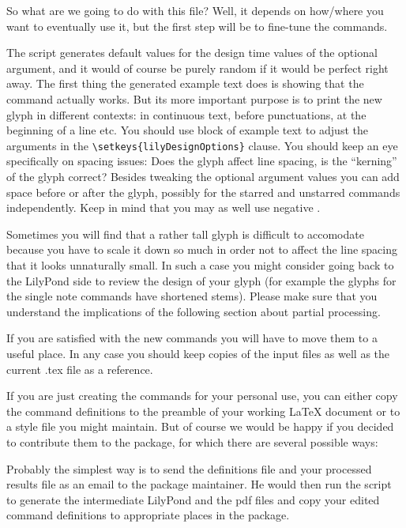 \documentclass{article}
\begin{document}
So what are we going to do with this file?
Well, it depends on how/where you want to eventually use it, but the first step will be to fine-tune the commands.

The script generates default values for the design time values of the optional argument, and it would of course be purely random if it would be perfect right away.
The first thing the generated example text does is showing that the command actually works.
But its more important purpose is to print the new glyph in different contexts: in continuous text, before punctuations, at the beginning of a line etc.
You should use block of example text to adjust the arguments in the \verb|\setkeys{lilyDesignOptions}| clause.
You should keep an eye specifically on spacing issues: Does the glyph affect line spacing, is the “kerning” of the glyph correct?
Besides tweaking the optional argument values you can add space before or after the glyph, possibly for the starred and unstarred commands independently.
Keep in mind that you may as well use negative .

Sometimes you will find that a rather tall glyph is difficult to accomodate because you have to scale it down so much in order not to affect the line spacing that it looks unnaturally small.
In such a case you might consider going back to the LilyPond side to review the design of your glyph (for example the glyphs for the single note commands have shortened stems).
Please make sure that you understand the implications of the following section about partial processing.

\medskip
If you are satisfied with the new commands you will have to move them to a useful place.
In any case you should keep copies of the input files as well as the current .tex file as a reference.

If you are just creating the commands for your personal use, you can either copy the command definitions to the preamble of your working \LaTeX{} document or to a style file you might maintain.
But of course we would be happy if you decided to contribute them to the package, for which there are several possible ways:

Probably the simplest way is to send the definitions file and your processed results file as an email to the package maintainer. He would then run the script to generate the intermediate LilyPond and the pdf files and copy your edited command definitions to appropriate places in the package.
\end{document}
